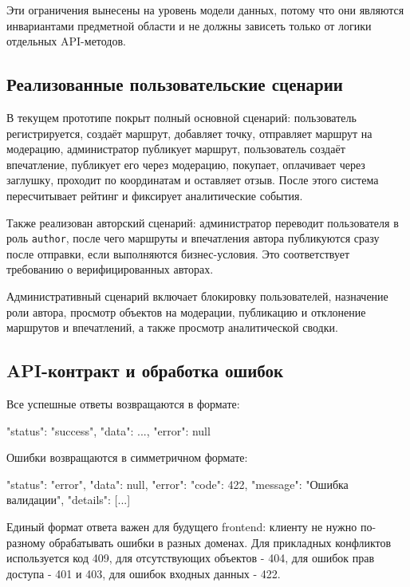 \documentclass[a4paper,12pt]{extarticle}
\begin{document}
Эти ограничения вынесены на уровень модели данных, потому что они являются инвариантами предметной области и не должны зависеть только от логики отдельных API-методов.

\subsection{Реализованные пользовательские сценарии}

В текущем прототипе покрыт полный основной сценарий: пользователь регистрируется, создаёт маршрут, добавляет точку, отправляет маршрут на модерацию, администратор публикует маршрут, пользователь создаёт впечатление, публикует его через модерацию, покупает, оплачивает через заглушку, проходит по координатам и оставляет отзыв. После этого система пересчитывает рейтинг и фиксирует аналитические события.

Также реализован авторский сценарий: администратор переводит пользователя в роль \texttt{author}, после чего маршруты и впечатления автора публикуются сразу после отправки, если выполняются бизнес-условия. Это соответствует требованию о верифицированных авторах.

Административный сценарий включает блокировку пользователей, назначение роли автора, просмотр объектов на модерации, публикацию и отклонение маршрутов и впечатлений, а также просмотр аналитической сводки.

\newpage

\subsection{API-контракт и обработка ошибок}

Все успешные ответы возвращаются в формате:
\begin{jsonblock}
{
    "status": "success",
    "data": ...,
    "error": null
}
\end{jsonblock}

Ошибки возвращаются в симметричном формате:
\begin{jsonblock}
{
    "status": "error",
    "data": null,
    "error": {
      "code": 422,
      "message": "Ошибка валидации",
      "details": [...]
    }
}
\end{jsonblock}

Единый формат ответа важен для будущего frontend: клиенту не нужно по-разному обрабатывать ошибки в разных доменах. Для прикладных конфликтов используется код 409, для отсутствующих объектов - 404, для ошибок прав доступа - 401 и 403, для ошибок входных данных - 422.
\end{document}
